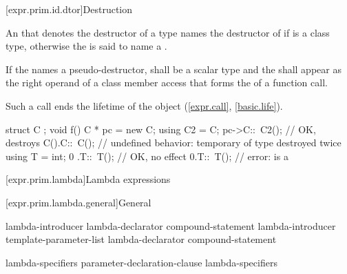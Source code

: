 [expr.prim.id.dtor]{Destruction}

\pnum
{}%
%
An  that denotes the destructor of a type 
names the destructor of 
if  is a class type,
otherwise the  is said
to name a .

\pnum
If the  names a pseudo-destructor,
 shall be a scalar type and
the  shall appear
as the right operand of a class member access that forms
the  of a function call.
\begin{note}
Such a call ends the lifetime of the object (\ref{expr.call}, \ref{basic.life}).
\end{note}

\pnum
\begin{example}
\begin{codeblock}
struct C { };
void f() {
  C * pc = new C;
  using C2 = C;
  pc->C::~C2();     // OK, destroys 
  C().C::~C();      // undefined behavior: temporary of type  destroyed twice
  using T = int;
  0 .T::~T();       // OK, no effect
  0.T::~T();        // error:  is a 
}
\end{codeblock}
\end{example}

[expr.prim.lambda]{Lambda expressions}%

[expr.prim.lambda.general]{General}%

\begin{bnf}
\br
    lambda-introducer lambda-declarator compound-statement\br
    lambda-introducer \terminal{<} template-parameter-list \terminal{>}  lambda-declarator compound-statement
\end{bnf}

\begin{bnf}
\br
    \terminal{[}  \terminal{]}
\end{bnf}

\begin{bnf}
\br
    lambda-specifiers\br
    \terminal{(} parameter-declaration-clause \terminal{)} lambda-specifiers 
\end{bnf}

